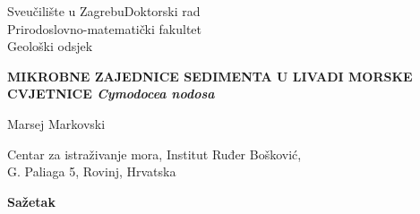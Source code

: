 \documentclass[
  12 pt,
]{book}
\begin{document}
{

    \singlespacing
    
    {
    
        \setlength{\parindent}{0pt}
        

Sveučilište u Zagrebu\hfill Doktorski rad\\
Prirodoslovno-matematički fakultet\\
Geološki odsjek

           
    }
    
    \bigskip
    
    {\Centering
    

\textbf{MIKROBNE ZAJEDNICE SEDIMENTA U LIVADI MORSKE CVJETNICE \emph{Cymodocea nodosa}}

\bigskip

Marsej Markovski

Centar za istraživanje mora, Institut Ruđer Bošković,\\
G. Paliaga 5, Rovinj, Hrvatska

\bigskip

\textbf{Sažetak}

    
    }
    

}
\end{document}
